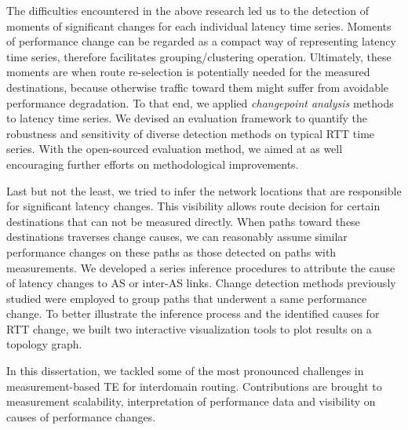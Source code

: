 The difficulties encountered in the above research led us to the detection of moments of significant changes for each individual latency time series.
Moments of performance change can be regarded as a compact way of representing latency time series, therefore facilitates grouping/clustering operation.
Ultimately, these moments are when route re-selection is potentially needed for the measured destinations, because otherwise traffic toward them might suffer from avoidable performance degradation.
To that end, we applied \textit{changepoint analysis} methods to latency time series.
We devised an evaluation framework to quantify the robustness and sensitivity of diverse detection methods on typical RTT time series.
With the open-sourced evaluation method, we aimed at as well encouraging further efforts on methodological improvements.

Last but not the least, we tried to infer the network locations that are responsible for significant latency changes. This visibility allows route decision for certain destinations that can not be measured directly.
When paths toward these destinations traverses change causes, we can reasonably assume similar performance changes on these paths as those detected on paths with measurements.
We developed a series inference procedures to attribute the cause of latency changes to \acf{AS} or inter-AS links.
Change detection methods previously studied were employed to group paths that underwent a same performance change.
To better illustrate the inference process and the identified causes for RTT change, we built two interactive visualization tools to plot results on a topology graph.

In this dissertation, we tackled some of the most pronounced challenges in measurement-based TE for interdomain routing. Contributions are brought to measurement scalability, interpretation of performance data and visibility on causes of performance changes. 
\vfill

\iffalse
\begin{otherlanguage}{french}
\pdfbookmark[1]{Résumé}{Résumé}
\chapter*{Résumé}
Le résume en français...
\end{otherlanguage}
\fi

\endgroup			

